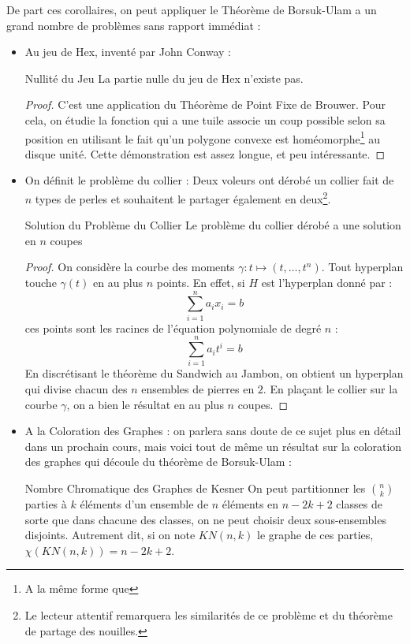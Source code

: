 \documentclass{cours}
\begin{document}
De part ces corollaires, on peut appliquer le Théorème de Borsuk-Ulam a un grand nombre de problèmes sans rapport immédiat : 
\begin{itemize}
    \item Au jeu de Hex, inventé par John Conway : 
    \begin{théorème}{Nullité du Jeu}{}
        La partie nulle du jeu de Hex n'existe pas. 
    \end{théorème}
    \begin{proof}
        C'est une application du Théorème de Point Fixe de Brouwer. Pour cela, on étudie la fonction qui a une tuile associe un coup possible selon sa position en utilisant le fait qu'un polygone convexe est homéomorphe\footnote{A la même forme que} au disque unité. Cette démonstration est assez longue, et peu intéressante.
    \end{proof}
    \item On définit le problème du collier : Deux voleurs ont dérobé un collier fait de $n$ types de perles et souhaitent le partager également en deux\footnote{Le lecteur attentif remarquera les similarités de ce problème et du théorème de partage des nouilles.}.
    \begin{théorème}{Solution du Problème du Collier}{}
        Le problème du collier dérobé a une solution en $n$ coupes
    \end{théorème} 
    \begin{proof}
        On considère la courbe des moments $\gamma : t \mapsto \left(t, \ldots, t^{n}\right)$. Tout hyperplan touche $\gamma(t)$ en au plus $n$ points. En effet, si $H$ est l'hyperplan donné par : 
        \[
            \sum_{i = 1}^{n} a_{i}x_{i} = b
        \]
        ces points sont les racines de l'équation polynomiale de degré $n$ : 
        \[
            \sum_{i = 1}^{n}a_{i}t^{i} = b
        \]
        En discrétisant le théorème du Sandwich au Jambon, on obtient un hyperplan qui divise chacun des $n$ ensembles de pierres en $2$. En plaçant le collier sur la courbe $\gamma$, on a bien le résultat en au plus $n$ coupes.  
    \end{proof}

    \item A la Coloration des Graphes : on parlera sans doute de ce sujet plus en détail dans un prochain cours, mais voici tout de même un résultat sur la coloration des graphes qui découle du théorème de Borsuk-Ulam : 
    \begin{théorème}{Nombre Chromatique des Graphes de Kesner}{}
        On peut partitionner les $\binom{n}{k}$ parties à $k$ éléments d'un ensemble de $n$ éléments en $n - 2k + 2$ classes de sorte que dans chacune des classes, on ne peut choisir deux sous-ensembles disjoints. Autrement dit, si on note $KN(n, k)$ le graphe de ces parties, $\chi\left(KN(n, k)\right) = n - 2k + 2$.
    \end{théorème}
\end{itemize}
\end{document}
